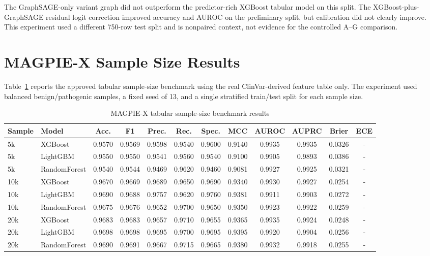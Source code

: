\documentclass[conference]{IEEEtran}
\begin{document}
The GraphSAGE-only variant graph did not outperform the predictor-rich XGBoost tabular model on this split. The XGBoost-plus-GraphSAGE residual logit correction improved accuracy and AUROC on the preliminary split, but calibration did not clearly improve. This experiment used a different 750-row test split and is nonpaired context, not evidence for the controlled A--G comparison.

\section{MAGPIE-X Sample Size Results}
Table~\ref{tab:sample-size-results} reports the approved tabular sample-size benchmark using the real ClinVar-derived feature table only. The experiment used balanced benign/pathogenic samples, a fixed seed of 13, and a single stratified train/test split for each sample size.

\begin{table}[t]
\centering
\scriptsize
\caption{MAGPIE-X tabular sample-size benchmark results}
\label{tab:sample-size-results}
\begin{tabular}{llcccccccccc}
\toprule
Sample & Model & Acc. & F1 & Prec. & Rec. & Spec. & MCC & AUROC & AUPRC & Brier & ECE \\
\midrule
5k & XGBoost & 0.9570 & 0.9569 & 0.9598 & 0.9540 & 0.9600 & 0.9140 & 0.9935 & 0.9935 & 0.0326 & - \\
5k & LightGBM & 0.9550 & 0.9550 & 0.9541 & 0.9560 & 0.9540 & 0.9100 & 0.9905 & 0.9893 & 0.0386 & - \\
5k & RandomForest & 0.9540 & 0.9544 & 0.9469 & 0.9620 & 0.9460 & 0.9081 & 0.9927 & 0.9925 & 0.0321 & - \\
10k & XGBoost & 0.9670 & 0.9669 & 0.9689 & 0.9650 & 0.9690 & 0.9340 & 0.9930 & 0.9927 & 0.0254 & - \\
10k & LightGBM & 0.9690 & 0.9688 & 0.9757 & 0.9620 & 0.9760 & 0.9381 & 0.9911 & 0.9903 & 0.0272 & - \\
10k & RandomForest & 0.9675 & 0.9676 & 0.9652 & 0.9700 & 0.9650 & 0.9350 & 0.9923 & 0.9922 & 0.0259 & - \\
20k & XGBoost & 0.9683 & 0.9683 & 0.9657 & 0.9710 & 0.9655 & 0.9365 & 0.9935 & 0.9924 & 0.0248 & - \\
20k & LightGBM & 0.9698 & 0.9698 & 0.9695 & 0.9700 & 0.9695 & 0.9395 & 0.9920 & 0.9904 & 0.0256 & - \\
20k & RandomForest & 0.9690 & 0.9691 & 0.9667 & 0.9715 & 0.9665 & 0.9380 & 0.9932 & 0.9918 & 0.0255 & - \\
\bottomrule
\end{tabular}
\end{table}
\end{document}
